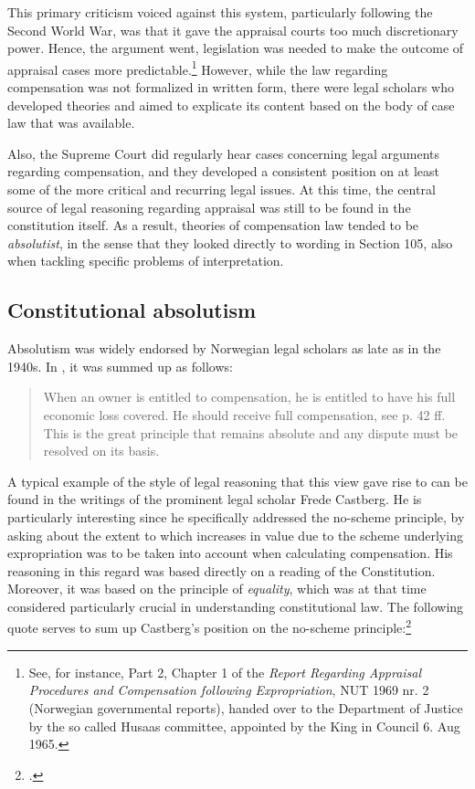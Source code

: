 This primary criticism voiced against this system, particularly following the Second World War, was that it gave the appraisal courts too much discretionary power. Hence, the argument went, legislation was needed to make the outcome of appraisal cases more predictable.\footnote{See, for instance, Part 2, Chapter 1 of the \emph{Report Regarding Appraisal Procedures and Compensation following Expropriation}, NUT 1969 nr. 2 (Norwegian governmental reports), handed over to the Department of Justice by the so called Husaas committee, appointed by the King in Council 6. Aug 1965.} However, while the law regarding compensation was not formalized in written form, there were legal scholars who developed theories and aimed to explicate its content based on the body of case law that was available. 

Also, the Supreme Court did regularly hear cases concerning legal arguments regarding compensation, and they developed a consistent position on at least some of the more critical and recurring legal issues. At this time, the central source of legal reasoning regarding appraisal was still to be found in the constitution itself. As a result, theories of compensation law tended to be \emph{absolutist}, in the sense that they looked directly to wording in Section 105, also when tackling specific problems of interpretation. 

\subsection{Constitutional absolutism}

Absolutism was widely endorsed by Norwegian legal scholars as late as in the 1940s. In \cite[p. 177]{schj}, it was summed up as follows:

\begin{quote}
When an owner is entitled to compensation, he is entitled to have his full economic loss covered. He should receive full compensation, see p. 42 ff. This is the great principle that remains absolute and any dispute must be resolved on its basis.
\end{quote}

A typical example of the style of legal reasoning that this view gave rise to can be found in the writings of the prominent legal scholar Frede Castberg. He is particularly interesting since he specifically addressed the no-scheme principle, by asking about the extent to which increases in value due to the scheme underlying expropriation was to be taken into account when calculating compensation. His reasoning in this regard was based directly on a reading of the Constitution. Moreover, it was based on the principle of \emph{equality}, which was at that time considered particularly crucial in understanding constitutional law. The following quote serves to sum up Castberg's position on the no-scheme principle:\footcite[Volume 2, p. 268]{castberg}

